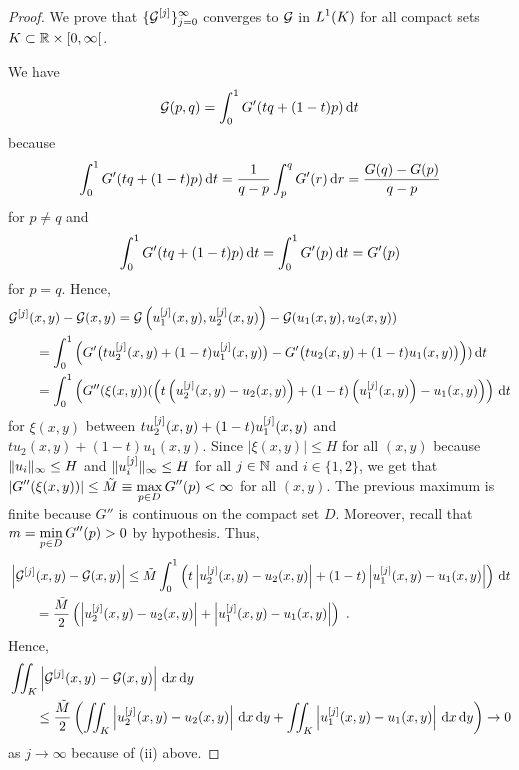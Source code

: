 \begin{proof}
  We prove that $\displaystyle \{ {\cal G}^{[j]} \}_{j=0}^\infty$
converges to ${\cal G}$ in $\displaystyle L^1(K)$ for all compact
sets $K \subset \mathbb{R} \times [0,\infty[$.

We have
\begin{equation} \label{shock_uniqueEq9}
{\cal G}(p,q) = \int_0^1 G'(t q + (1-t) p) \,\mathrm{d}{t}
\end{equation}
because
\[
\int_0^1 G'(tq  + (1-t) p) \,\mathrm{d}{t}
= \frac{1}{q - p} \int_{p}^{q} G'(r) \,\mathrm{d}{r} 
= \frac{G(q) - G(p)}{q - p}
\]
for $p \neq q$ and
\[
\int_0^1 G'(t q + (1-t) p) \,\mathrm{d}{t} = \int_0^1 G'(p) \,\mathrm{d}{t} = G'(p)
\]
for $p = q$.  Hence,
\begin{align*}
&{\cal G}^{[j]}(x,y) - {\cal G}(x,y)
= {\cal G}\left(u_1^{[j]}(x,y),u_2^{[j]}(x,y)\right)
- {\cal G}(u_1(x,y),u_2(x,y)) \\
&\qquad = \int_0^1 \left( G'\big(t u_2^{[j]}(x,y) + (1-t) u_1^{[j]}(x,y)\big)
- G'\big(t u_2(x,y) + (1-t) u_1(x,y)\big) \right)) \,\mathrm{d}{t} \\
&\qquad = \int_0^1 \left( G''(\xi(x,y))
(\left(t \left(u_2^{[j]}(x,y)-u_2(x,y)\right)
+ (1-t) \left( u_1^{[j]}(x,y)\right) - u_1(x,y)\right) \right) \,\mathrm{d}{t}
\end{align*}
for $\xi(x,y)$ between
$\displaystyle t u_2^{[j]}(x,y) + (1-t) u_1^{[j]}(x,y)$
and $t u_2(x,y) + (1-t) u_1(x,y)$.  Since $|\xi(x,y)| \leq H$ for all
$(x,y)$ because $\displaystyle \|u_i\|_\infty \leq H$ and
$\displaystyle \|u_i^{[j]}\|_\infty \leq H$ for all $j\in \mathbb{N}$
and $i \in \{1,2\}$, we get that
$\displaystyle |G''(\xi(x,y))| \leq \tilde{M} \equiv
\max_{p \in D} G''(p) < \infty$ for all $(x,y)$.  The previous maximum
is finite because $G''$ is continuous on the compact set $D$.
Moreover, recall that
$\displaystyle m = \min_{p \in D} G''(p) >0$ by hypothesis.
Thus,
\begin{align*}
&\left| {\cal G}^{[j]}(x,y) - {\cal G}(x,y) \right|
\leq \tilde{M} \int_0^1 \left(t \left|u_2^{[j]}(x,y)-u_2(x,y)\right|
+ (1-t) \left|u_1^{[j]}(x,y) - u_1(x,y)\right| \right) \,\mathrm{d}{t} \\
& \qquad = \frac{\tilde{M}}{2}\left( \left|u_2^{[j]}(x,y)-u_2(x,y)\right|
+ \left|u_1^{[j]}(x,y) - u_1(x,y)\right| \right) \ .
\end{align*}
Hence,
\begin{align*}
&\iint_K\left| {\cal G}^{[j]}(x,y) - {\cal G}(x,y) \right| \,\mathrm{d}{x}\,\mathrm{d}{y} \\
&\qquad \leq \frac{\tilde{M}}{2}\left( \iint_K
\left|u_2^{[j]}(x,y)-u_2(x,y)\right| \,\mathrm{d}{x} \,\mathrm{d}{y}
+ \iint_K \left|u_1^{[j]}(x,y) - u_1(x,y)\right| \,\mathrm{d}{x} \,\mathrm{d}{y} \right) \to 0  
\end{align*}
as $j \to \infty$ because of (ii) above.


\end{proof}
